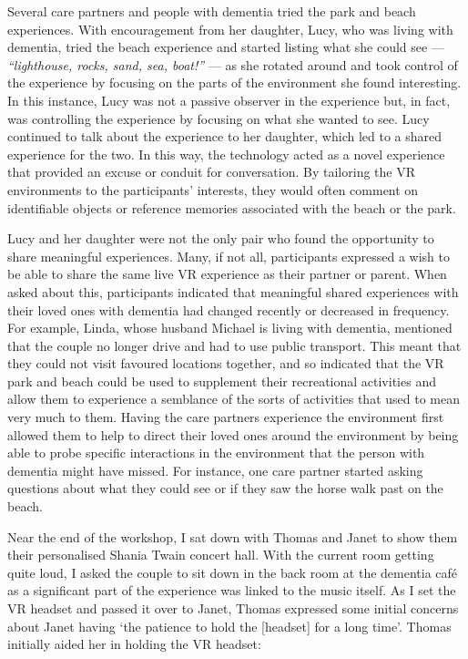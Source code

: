 Several care partners and people with dementia tried the park and beach experiences. With encouragement from her daughter, Lucy, who was living with dementia, tried the beach experience and started listing what she could see — \textit{``lighthouse, rocks, sand, sea, boat!''} — as she rotated around and took control of the experience by focusing on the parts of the environment she found interesting. In this instance, Lucy was not a passive observer in the experience but, in fact, was controlling the experience by focusing on what she wanted to see. Lucy continued to talk about the experience to her daughter, which led to a shared experience for the two. In this way, the technology acted as a novel experience that provided an excuse or conduit for conversation. By tailoring the VR environments to the participants' interests, they would often comment on identifiable objects or reference memories associated with the beach or the park.

Lucy and her daughter were not the only pair who found the opportunity to share meaningful experiences. Many, if not all, participants expressed a wish to be able to share the same live VR experience as their partner or parent. When asked about this, participants indicated that meaningful shared experiences with their loved ones with dementia had changed recently or decreased in frequency. For example, Linda, whose husband Michael is living with dementia, mentioned that the couple no longer drive and had to use public transport. This meant that they could not visit favoured locations together, and so indicated that the VR park and beach could be used to supplement their recreational activities and allow them to experience a semblance of the sorts of activities that used to mean very much to them. Having the care partners experience the environment first allowed them to help to direct their loved ones around the environment by being able to probe specific interactions in the environment that the person with dementia might have missed. For instance, one care partner started asking questions about what they could see or if they saw the horse walk past on the beach. 

Near the end of the workshop, I sat down with Thomas and Janet to show them their personalised Shania Twain concert hall. With the current room getting quite loud, I asked the couple to sit down in the back room at the dementia café as a significant part of the experience was linked to the music itself. As I set the VR headset and passed it over to Janet, Thomas expressed some initial concerns about Janet having ‘the patience to hold the [headset] for a long time’. Thomas initially aided her in holding the VR headset:

